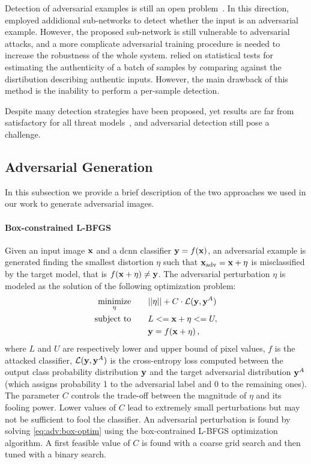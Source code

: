 Detection of adversarial examples is still an open problem~\cite{papernot2016limitations}.
In this direction, \citet{gong2017adversarial,metzen2017detecting} employed addidional sub-networks to detect whether the input is an adversarial example.
However, the proposed sub-network is still vulnerable to adversarial attacks, and a more complicate adversarial training procedure is needed to increase the robustness of the whole system.
\citet{feinman2017detecting,grosse2017statistical} relied on statistical tests for estimating the authenticity of a batch of samples by comparing against the disrtibution describing authentic inputs.
However, the main drawback of this method is the inability to perform a per-sample detection.

Despite many detection strategies have been proposed, yet results are far from satisfactory for all threat models~\cite{carlini2017adversarial}, and adversarial detection still pose a challenge.

\subsection{Adversarial Generation}
\label{sec:adv:algos}
In this subsection we provide a brief description of the two approaches %
we used in our work to generate adversarial images.
\paragraph{Box-constrained L-BFGS~\cite{tabacof2016exploring,szegedy2013intriguing}}
Given an input image $\mathbf{x}$ and a \gls{dcnn} classifier $\mathbf{y} = f(\mathbf{x})$, an adversarial example is generated finding the smallest distortion $\eta$ such that $\mathbf{x}_\text{adv} = \mathbf{x} + \eta$ is misclassified by the target model, that is $f(\mathbf{x}+\eta) \neq \mathbf{y}$.
The adversarial perturbation $\eta$ is modeled as the solution of the following optimization problem:
\begin{equation} \label{eq:adv:box-optim}
\begin{split}
\underset{\eta}{\text{minimize}}&\qquad ||\eta|| + C \cdot \mathcal{L}(\mathbf{y},\mathbf{y}^A) \\
\text{subject to} 				&\qquad L <= \mathbf{x}+\eta <= U, \\
                                &\qquad \mathbf{y} = f(\mathbf{x}+\eta) \,,
\end{split}
\end{equation}
where $L$ and $U$ are respectively lower and upper bound of pixel values, $f$ is the attacked classifier, $\mathcal{L}(\mathbf{y},\mathbf{y}^A)$ is the cross-entropy loss computed between the output class probability distribution $\mathbf{y}$ and the target adversarial distribution $\mathbf{y}^A$ (which assigns probability 1 to the adversarial label and 0 to the remaining ones).
The parameter $C$ controls the trade-off between the magnitude of $\eta$ and its fooling power.
Lower values of $C$ lead to extremely small perturbations but may not be sufficient to fool the classifier.
An adversarial perturbation is found by solving \ref{eq:adv:box-optim} using the box-contrained L-BFGS optimization algorithm.
A first feasible value of $C$ is found with a coarse grid search and then tuned with a binary search.


